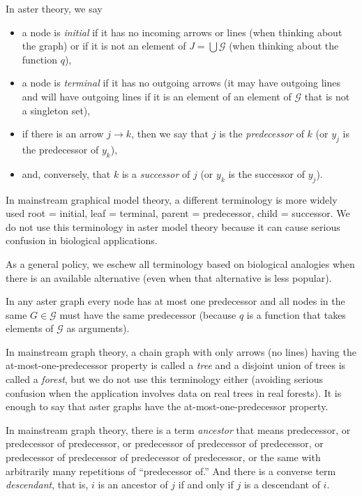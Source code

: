 In aster theory, we say
\begin{itemize}
\item a node is \emph{initial} if it has no incoming arrows
    or lines (when thinking about the graph) or if it is not an element
    of $J = \bigcup \mathcal{G}$ (when thinking about the function $q$),
\item a node is \emph{terminal} if it has no outgoing arrows
    (it may have outgoing lines and will have outgoing lines if it is
    an element of an element of $\mathcal{G}$ that is not a singleton set),
\item if there is an arrow $j \longrightarrow k$, then we say that $j$
    is the \emph{predecessor} of $k$ (or $y_j$ is the predecessor of $y_k$),
\item and, conversely, that $k$ is a \emph{successor} of $j$
    (or $y_k$ is the successor of $y_j$).
\end{itemize}
In mainstream graphical model theory, a different terminology is more widely
used \citep{lauritzen} root = initial, leaf = terminal, parent = predecessor,
child = successor.  We do not use this terminology in aster model theory
because it can cause serious confusion in biological applications.

As a general policy, we eschew all terminology based on biological analogies
when there is an available alternative (even when that alternative is less
popular).

In any aster graph every node has at most one predecessor and all nodes in
the same $G \in \mathcal{G}$ must have the same predecessor (because $q$
is a function that takes elements of $\mathcal{G}$ as arguments).

In mainstream graph theory, a chain graph with only arrows (no lines) having
the at-most-one-predecessor property is called a \emph{tree} and a disjoint
union of trees is called a \emph{forest}, but we do not use this terminology
either (avoiding serious confusion when the application involves data on
real trees in real forests).  It is enough to say that aster graphs
have the at-most-one-predecessor property.

In mainstream graph theory, there is a term \emph{ancestor} that means
predecessor, or predecessor of predecessor,
or predecessor of predecessor of predecessor,
or predecessor of predecessor of predecessor of predecessor,
or the same with arbitrarily many repetitions of ``predecessor of.''
And there is a converse term \emph{descendant}, that is, $i$ is an ancestor
of $j$ if and only if $j$ is a descendant of $i$.


